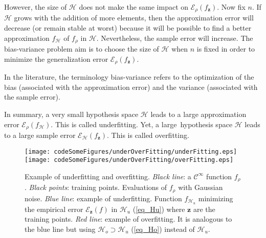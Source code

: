 However, the size of $\mathcal{H}$ does not make the same impact on $\mathcal{E}_{\rho}(f_{\pmb{z}})$. Now fix $n$. If $\mathcal{H}$ grows with the addition of more elements, then the approximation error will decrease (or remain stable at worst) because it will be possible to find a better approximation $f_{\mathcal{H}}$ of $f_{\rho}$ in $\mathcal{H}$. Nevertheless, the sample error will increase. The bias-variance problem aim is to choose the size of $\mathcal{H}$ when $n$ is fixed in order to minimize the generalization error $\mathcal{E}_{\rho}(f_{\pmb{z}})$. 

In the literature, the terminology bias-variance refers to the optimization of the bias (associated with the approximation error) and the variance (associated with the sample error).

In summary, a very small hypothesis space $\mathcal{H}$ leads to a large approximation error $\mathcal{E}_{\rho}(f_{\mathcal{H}})$. This is called underfitting. Yet, a large hypothesis space $\mathcal{H}$ leads to a large sample error $\mathcal{E}_{\mathcal{H}}(f_{\pmb{z}})$. This is called overfitting.  

\begin{figure}[!htbp]
  \centering
    \texttt{[image: codeSomeFigures/underOverFitting/underFitting.eps]}
    \texttt{[image: codeSomeFigures/underOverFitting/overFitting.eps]}
  \caption[Example of underfitting and overfitting]%
{Example of underfitting and overfitting. 
  \emph{Black line}: a $\mathcal{C}^{\infty}$ function $f_{\rho}$. 
  \emph{Black points}: training points. Evaluations of $f_{\rho}$ with Gaussian noise. 
  \emph{Blue line}: example of underfitting. Function $f_{\mathcal{H}_{u}}$ minimizing the empirical error $\mathcal{E}_{\pmb{z}}(f)$ in 
  $\mathcal{H}_u$ (\ref{eq_Hu}) 
  where $\pmb{z}$ are the training points.
  \emph{Red line}: example of overfitting. It is analogous to the blue line but using
  $\mathcal{H}_o \supset \mathcal{H}_u$ (\ref{eq_Ho}) 
  instead of $\mathcal{H}_u$.}
  \label{fig_overUnderFitting}
\end{figure}

